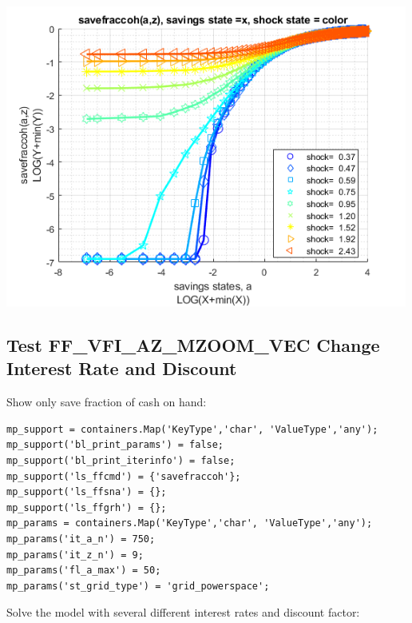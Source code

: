 \documentclass[
]{book}
\begin{document}
\includegraphics[width=5.20833in,height=\textheight]{img/fx_vfi_az_mzoom_vec_images/figure_3.png}

\hypertarget{test-ff_vfi_az_mzoom_vec-change-interest-rate-and-discount}{%
\subsection{Test FF\_VFI\_AZ\_MZOOM\_VEC Change Interest Rate and Discount}\label{test-ff_vfi_az_mzoom_vec-change-interest-rate-and-discount}}

Show only save fraction of cash on hand:

\begin{verbatim}
mp_support = containers.Map('KeyType','char', 'ValueType','any');
mp_support('bl_print_params') = false;
mp_support('bl_print_iterinfo') = false;
mp_support('ls_ffcmd') = {'savefraccoh'};
mp_support('ls_ffsna') = {};
mp_support('ls_ffgrh') = {};
mp_params = containers.Map('KeyType','char', 'ValueType','any');
mp_params('it_a_n') = 750;
mp_params('it_z_n') = 9;
mp_params('fl_a_max') = 50;
mp_params('st_grid_type') = 'grid_powerspace';
\end{verbatim}

Solve the model with several different interest rates and discount
factor:
\end{document}
